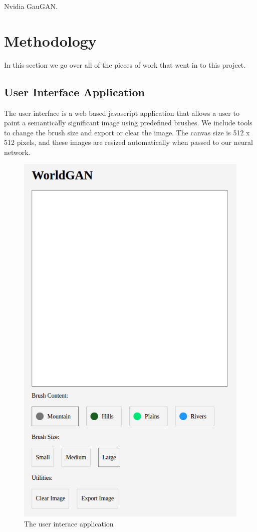 \documentclass[twocolumn]{article}
\begin{document}
	Nvidia GauGAN.
	
	\section{Methodology}
	
	In this section we go over all of the pieces of work that went in to this project.
	
	\subsection{User Interface Application}
	
	The user interface is a web based javascript application that allows a user to paint a semantically significant image using predefined brushes. We include tools to change the brush size and export or clear the image. The canvas size is 512 x 512 pixels, and these images are resized automatically when passed to our neural network.

	\begin{figure}[h!]
	\includegraphics[width=1\columnwidth]{ui.png} 
	\caption{The user interace application}
	\end{figure}
	
\end{document}
